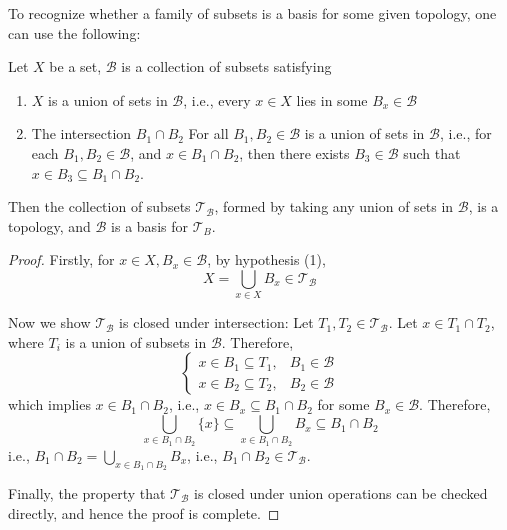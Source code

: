 \begin{example}
To recognize whether a family of subsets is a basis for some given topology, one can use the following:
\begin{proposition} \label{prop:basis_topology} Let \(X\) be a set, \(\mathcal{B}\) is a collection of subsets satisfying

\begin{enumerate}
    \item \(X\) is a union of sets in \(\mathcal{B}\), i.e., every \(x \in  X\) lies in some \(B_x \in  \mathcal{B}\)
    \item The intersection \(B_1 \cap  B_2\) For all \(B_1,B_2 \in  \mathcal{B}\) is a union of sets in \(\mathcal{B}\), i.e., for each \(B_1,B_2 \in  \mathcal{B}\), and \(x \in  B_1 \cap  B_2\), then there exists \({B}_{3} \in  \mathcal{B}\) such that \(x \in  {B}_{3} \subseteq  B_1 \cap  B_2\).
\end{enumerate}
Then the collection of subsets \({\mathcal{T}}_{\mathcal{B}}\), formed by taking any union of sets in \(\mathcal{B}\), is a topology, and \(\mathcal{B}\) is a basis for \({\mathcal{T}}_{B}\).
\end{proposition}

\begin{proof} Firstly, for \(x \in  X,B_x \in  \mathcal{B}\), by hypothesis (1),
\[
X = \mathop{\bigcup}\limits_{{x \in  X}}B_x \in  {\mathcal{T}}_{\mathcal{B}}
\]

Now we show $\mathcal{T}_{\mathcal{B}}$ is closed under intersection: Let \({T}_{1},{T}_{2} \in  {\mathcal{T}}_{\mathcal{B}}\). Let \(x \in  {T}_{1} \cap  {T}_{2}\), where \({T}_{i}\) is a union of subsets in \(\mathcal{B}\). Therefore,
\[
\left\{  \begin{array}{ll} x \in  B_1 \subseteq  {T}_{1}, & B_1 \in  \mathcal{B} \\  x \in  B_2 \subseteq  {T}_{2}, & B_2 \in  \mathcal{B} \end{array}\right.
\]
which implies \(x \in  B_1 \cap  B_2\), i.e., \(x \in  B_x \subseteq  B_1 \cap  B_2\) for some \(B_x \in  \mathcal{B}\). Therefore,
\[
\mathop{\bigcup}\limits_{{x \in  B_1 \cap  B_2}}\{ x\}  \subseteq  \mathop{\bigcup}\limits_{{x \in  B_1 \cap  B_2}}B_x \subseteq  B_1 \cap  B_2
\]
i.e., \(B_1 \cap  B_2 = \mathop{\bigcup}\limits_{{x \in  B_1 \cap  B_2}}B_x\), i.e., \(B_1 \cap  B_2 \in  {\mathcal{T}}_{\mathcal{B}}\).

Finally, the property that \({\mathcal{T}}_{\mathcal{B}}\) is closed under union operations can be checked directly, and hence the proof is complete.
\end{proof}


\end{example}
